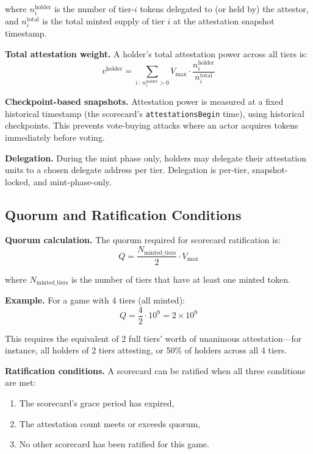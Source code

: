 \documentclass[11pt,a4paper]{article}
\begin{document}
where $n_i^{\text{holder}}$ is the number of tier-$i$ tokens delegated to (or held by) the attestor, and $n_i^{\text{total}}$ is the total minted supply of tier $i$ at the attestation snapshot timestamp.

\textbf{Total attestation weight.} A holder's total attestation power across all tiers is:
\begin{equation}
v^{\text{holder}} = \sum_{i \,:\, n_i^{\text{holder}} > 0} V_{\max} \cdot \frac{n_i^{\text{holder}}}{n_i^{\text{total}}}
\end{equation}

\textbf{Checkpoint-based snapshots.} Attestation power is measured at a fixed historical timestamp (the scorecard's \texttt{attestationsBegin} time), using historical checkpoints. This prevents vote-buying attacks where an actor acquires tokens immediately before voting.

\textbf{Delegation.} During the mint phase only, holders may delegate their attestation units to a chosen delegate address per tier. Delegation is per-tier, snapshot-locked, and mint-phase-only.

\subsection{Quorum and Ratification Conditions}

\textbf{Quorum calculation.} The quorum required for scorecard ratification is:
\begin{equation}
\boxed{Q = \frac{N_{\text{minted\_tiers}}}{2} \cdot V_{\max}}
\end{equation}

where $N_{\text{minted\_tiers}}$ is the number of tiers that have at least one minted token.

\textbf{Example.} For a game with 4 tiers (all minted):
$$Q = \frac{4}{2} \cdot 10^9 = 2 \times 10^9$$

This requires the equivalent of 2 full tiers' worth of unanimous attestation---for instance, all holders of 2 tiers attesting, or 50\% of holders across all 4 tiers.

\textbf{Ratification conditions.} A scorecard can be ratified when all three conditions are met:
\begin{enumerate}[nosep]
    \item The scorecard's grace period has expired,
    \item The attestation count meets or exceeds quorum,
    \item No other scorecard has been ratified for this game.
\end{enumerate}
\end{document}
